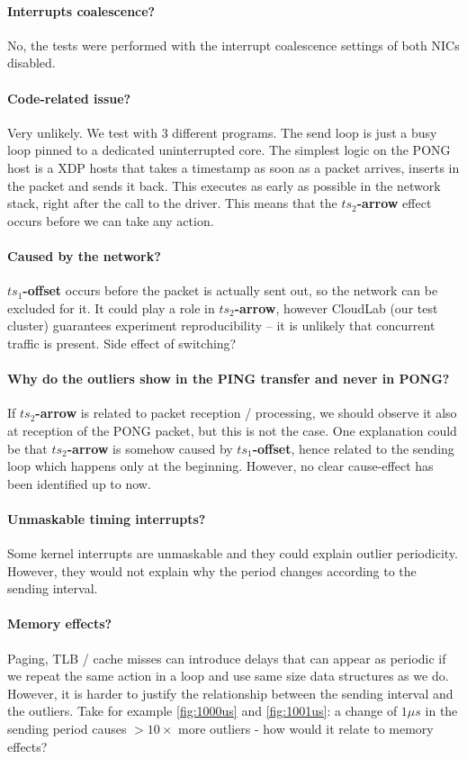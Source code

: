 \documentclass{article}
\begin{document}
\paragraph*{Interrupts coalescence?}
No, the tests were performed with the interrupt coalescence settings of both
NICs disabled. 

\paragraph*{Code-related issue?}
Very unlikely. We test with 3 different programs. The send loop is just a busy 
loop pinned to a dedicated uninterrupted core. The simplest logic on the PONG
host is a XDP hosts that takes a timestamp as soon as a packet arrives,
inserts in the packet and sends it back. This executes as early as possible in
the network stack, right after the call to the driver. This means that 
the \textbf{$ts_2$-arrow} effect occurs before we can take any action.

\paragraph*{Caused by the network?}
\textbf{$ts_1$-offset} occurs before the packet is actually sent out, so 
the network can be excluded for it. It could play a role in 
\textbf{$ts_2$-arrow}, however CloudLab (our test cluster) guarantees
experiment reproducibility -- it is unlikely that concurrent traffic is 
present. Side effect of switching?

\paragraph*{Why do the outliers show in the PING transfer and never in PONG?}
If \textbf{$ts_2$-arrow} is related to packet reception / processing, we 
should observe it also at reception of the PONG packet, but this is not the case.
One explanation could be that \textbf{$ts_2$-arrow} is somehow caused by
\textbf{$ts_1$-offset}, hence related to the sending loop which happens only
at the beginning. However, no clear cause-effect has been identified up to now.  

\paragraph*{Unmaskable timing interrupts?}
Some kernel interrupts are unmaskable and they could explain outlier 
periodicity. However, they would not explain why the period changes according
to the sending interval.

\paragraph*{Memory effects?}
Paging, TLB / cache misses can introduce delays that can appear as periodic if 
we repeat the same action in a loop and use same size data structures as we do.
However, it is harder to justify the relationship between the sending interval 
and the outliers. Take for example \autoref{fig:1000us} and 
\autoref{fig:1001us}: a change of $1\mu s$ in the sending period causes
$>10\times$ more outliers - how would it relate to memory effects?
\end{document}
